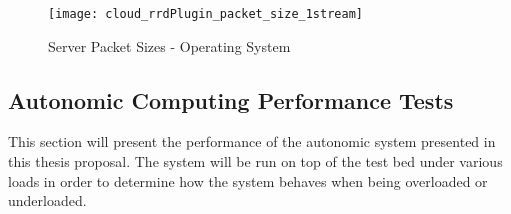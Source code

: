\begin{figure}
	\centering
		\texttt{[image: cloud\_rrdPlugin\_packet\_size\_1stream]}
	\caption{Server Packet Sizes - Operating System}
	\label{fig:1serv1streampacketsizes}
\end{figure}

\subsection{Autonomic Computing Performance Tests}

This section will present the performance of the autonomic system presented in this thesis proposal. The system will be run on top of the test bed under various loads in order to determine how the system behaves when being overloaded or underloaded.